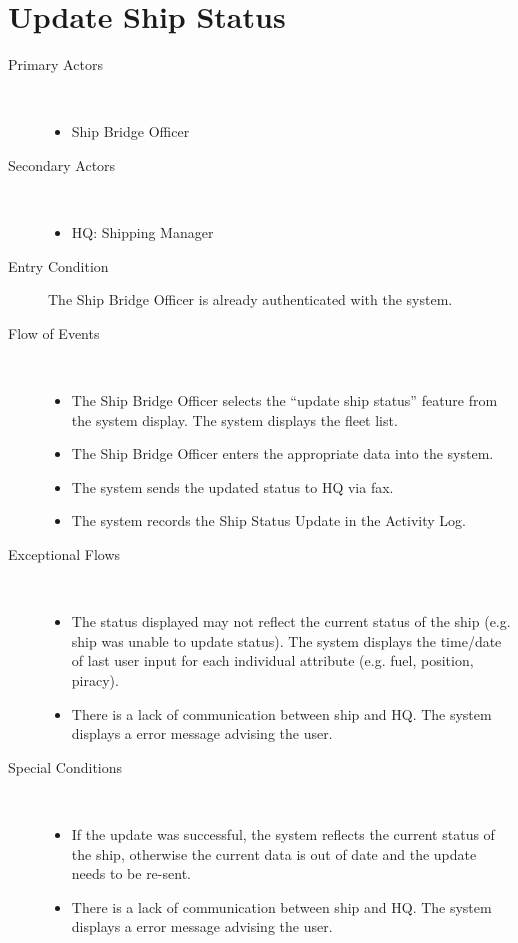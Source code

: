 \documentclass[a4paper,10pt]{report}
\begin{document}
\section{Update Ship Status}
\begin{description}
\item[Primary Actors] \
  \begin{itemize}
    \item Ship Bridge Officer
  \end{itemize}
\item[Secondary Actors] \
  \begin{itemize}
    \item HQ: Shipping Manager
  \end{itemize}
\item[Entry Condition]
  The Ship Bridge Officer is already authenticated with the system.
\item[Flow of Events] \
  \begin{itemize}
    \item The Ship Bridge Officer selects the ``update ship status'' feature from the system display. The system displays the fleet list.
    \item The Ship Bridge Officer enters the appropriate data into the system.
    \item The system sends the updated status to HQ via fax.
    \item The system records the Ship Status Update in the Activity Log.
  \end{itemize}
\item[Exceptional Flows] \
  \begin{itemize}
   \item The status displayed may not reflect the current status of the ship (e.g. ship was unable to update status). The system displays the time/date of last user input for each individual attribute (e.g. fuel, position, piracy).
   \item There is a lack of communication between ship and HQ. The system displays a error message advising the user.
  \end{itemize}
 \item[Special Conditions] \
  \begin{itemize}
  \item If the update was successful, the system reflects the current status of the ship, otherwise the current data is out of date and the update needs to be re-sent.
  \item There is a lack of communication between ship and HQ. The system displays a error message advising the user.
  \end{itemize}
\end{description}
\end{document}
